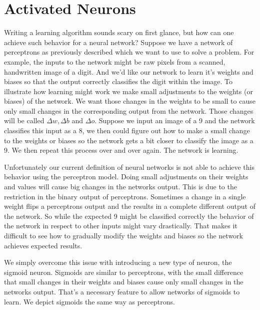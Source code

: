 \documentclass[10pt]{book}
\begin{document}
    \section{Activated Neurons}
    Writing a learning algorithm sounds scary on first glance, but how can one achieve such behavior for a neural network?
    Suppose we have a network of perceptrons as previously described which we want to use to solve a problem. For example, the inputs
    to the network might be raw pixels from a scanned, handwritten image of a digit. And we'd like our network to learn it's weights and biases so that the
    output correctly classifies the digit within the image. To illustrate how learning might work we make small adjustments to the weights (or biases) of the network.
    We want those changes in the weights to be small to cause only small changes in the corresponding output from the network. Those changes will be called
    \(\Delta w, \Delta b\) and \(\Delta o\). Suppose we input an image of a 9 and the network classifies this input as a 8, we then could figure out how to make a small
    change to the weights or biases so the network gets a bit closer to classify the image as a 9. We then repeat this process over and over again. The network is learning.

    Unfortunately our current definition of neural networks is not able to achieve this behavior using the perceptron model. Doing small adjustments on their weights and values
    will cause big changes in the networks output. This is due to the restriction in the binary output of perceptrons. Sometimes a change in a single weight flips a perceptrons output
    and the results in a complete different output of the network. So while the expected 9 might be classified correctly the behavior of the network in respect to other inputs
    might vary drastically. That makes it difficult to see how to gradually modify the weights and biases so the network achieves expected results.

    We simply overcome this issue with introducing a new type of neuron, the sigmoid neuron. Sigmoids are similar to perceptrons, with the small difference that small changes in their weights and biases cause only
    small changes in the networks output. That's a necessary feature to allow networks of sigmoids to learn. We depict sigmoids the same way as perceptrons. 
\end{document}

